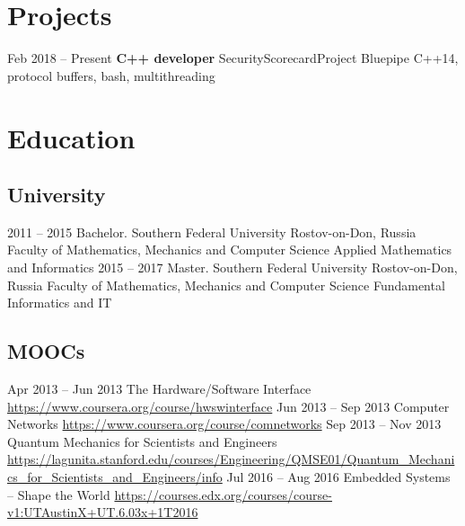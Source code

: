\documentclass[11pt,a4paper]{moderncv}
\newcommand{\EngRus}[2]{#1}
\newcommand{\BirthPlaceOfValour}{\EngRus{Rostov-on-Don, Russia}{Ростов-на-Дону, Россия}}
\begin{document}
\section{\EngRus{Projects}{Проекты}}
\cventry
  {\EngRus{Feb}{Февраль} 2018 -- \EngRus{Present}{н.в.}}
  {\bfseries \EngRus{C++ developer}{C++ программист}}
  {SecurityScorecard}{\EngRus{Project Bluepipe}{Проект Bluepipe}}
  {\newline{}C++14, protocol buffers, bash, \EngRus{multithreading}{многопоточность}} {}

\pagebreak

\section{\EngRus{Education}{Образование}}
  \subsection{\EngRus{University}{Университет}}
    \cventry
      {2011 -- 2015}
      {\EngRus{Bachelor. Southern Federal University}{Бакалавриат. Южный Федеральный Университет}}
      {\BirthPlaceOfValour}
      {\EngRus{Faculty of Mathematics, Mechanics and Computer Science}
      {Институт математики, механики и компьютерных наук им. И.И. Воровича}}
      {\EngRus{Applied Mathematics and Informatics}{Прикладная математика и информатика}}
      {}
    \cventry
      {2015 -- 2017}
      {\EngRus{Master. Southern Federal University}{Магистратура. Южный Федеральный Университет}}
      {\BirthPlaceOfValour}
      {\EngRus{Faculty of Mathematics, Mechanics and Computer Science}
      {Институт математики, механики и компьютерных наук им. И.И. Воровича}}
      {\EngRus{Fundamental Informatics and IT}{Фундаментальная информатика и информационные технологии}}
      {}
  \subsection{\EngRus{MOOCs}{Онлайн курсы}}
    \cventry
      {\EngRus{Apr}{Апрель} 2013 -- \EngRus{Jun}{Июнь} 2013}
      {The Hardware/Software Interface}
      {\newline\url{https://www.coursera.org/course/hwswinterface}}
      {}{}{}
    \cventry
      {\EngRus{Jun}{Июнь} 2013 -- \EngRus{Sep}{Сентябрь} 2013}
      {Computer Networks}
      {\newline\url{https://www.coursera.org/course/comnetworks}}
      {}{}{}
    \cventry
      {\EngRus{Sep}{Сентябрь} 2013 -- \EngRus{Nov}{Ноябрь} 2013}
      {Quantum Mechanics for Scientists and Engineers}
      {\newline\url{https://lagunita.stanford.edu/courses/Engineering/QMSE01/Quantum_Mechanics_for_Scientists_and_Engineers/info}}
      {}{}{}
    \cventry
      {\EngRus{Jul}{Июль} 2016 -- \EngRus{Aug}{Август} 2016}
      {Embedded Systems -- Shape the World}
      {\newline\url{https://courses.edx.org/courses/course-v1:UTAustinX+UT.6.03x+1T2016}}
      {}{}{}
\end{document}
